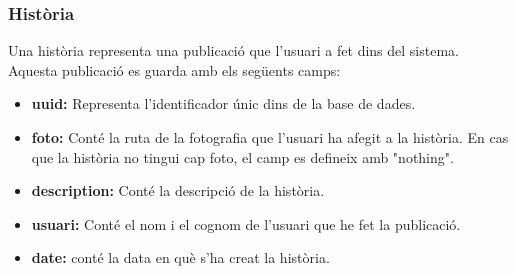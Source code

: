 \documentclass[11pt,catalan,listoffigures,listoftables]{tfgetsinf}
\begin{document}
\subsubsection{Història}

Una història representa una publicació que l'usuari a fet dins del sistema. Aquesta publicació es guarda amb els següents camps:
\begin{itemize}
\item \textbf{uuid:} Representa l'identificador únic dins de la base de dades.
\item \textbf{foto:} Conté la ruta de la fotografia que l'usuari ha afegit a la història. En cas que la història no tingui cap foto, el camp es defineix amb "nothing".
\item \textbf{description:} Conté la descripció de la història.
\item \textbf{usuari:} Conté el nom i el cognom de l'usuari que he fet la publicació.
\item \textbf{date:} conté la data en què s'ha creat la història.
\end{itemize}
\end{document}
